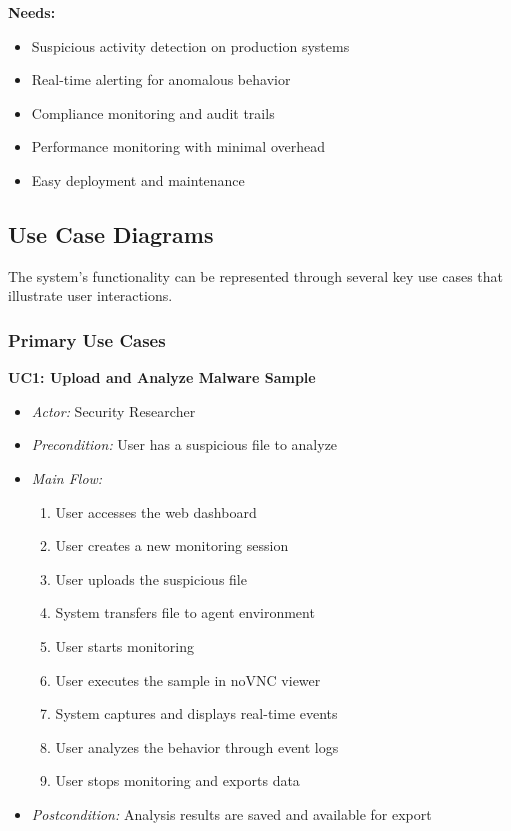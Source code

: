\textbf{Needs:}
\begin{itemize}
    \item Suspicious activity detection on production systems
    \item Real-time alerting for anomalous behavior
    \item Compliance monitoring and audit trails
    \item Performance monitoring with minimal overhead
    \item Easy deployment and maintenance
\end{itemize}

\subsection{Use Case Diagrams}

The system's functionality can be represented through several key use cases that illustrate user interactions.

\subsubsection{Primary Use Cases}

\textbf{UC1: Upload and Analyze Malware Sample}
\begin{itemize}
    \item \textit{Actor:} Security Researcher
    \item \textit{Precondition:} User has a suspicious file to analyze
    \item \textit{Main Flow:}
    \begin{enumerate}
        \item User accesses the web dashboard
        \item User creates a new monitoring session
        \item User uploads the suspicious file
        \item System transfers file to agent environment
        \item User starts monitoring
        \item User executes the sample in noVNC viewer
        \item System captures and displays real-time events
        \item User analyzes the behavior through event logs
        \item User stops monitoring and exports data
    \end{enumerate}
    \item \textit{Postcondition:} Analysis results are saved and available for export
\end{itemize}

